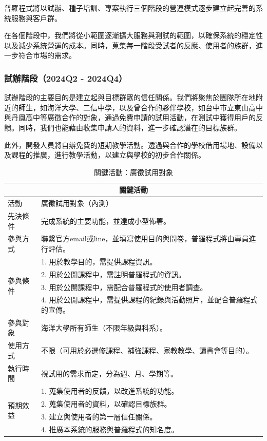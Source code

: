 普羅程式將以試辦、種子培訓、專案執行三個階段的營運模式逐步建立起完善的系統服務與客戶群。

在各個階段中，我們將從小範圍逐漸擴大服務與測試的範圍，以確保系統的穩定性以及減少系統營運的成本。同時，蒐集每一階段受試者的反應、使用者的族群，進一步符合市場的需求。
\subsubsection{試辦階段（2024Q2 - 2024Q4）}

試辦階段的主要目的是建立起與目標群眾的信任關係。我們將聚焦於團隊所在地附近的師生，如海洋大學、二信中學，以及曾合作的夥伴學校，如台中市立東山高中與丹鳳高中等廣徵合作的對象，通過免費申請的試用活動，在測試中獲得用戶的反饋。同時，我們也能藉由收集申請人的資料，進一步確認潛在的目標族群。

此外，開發人員將自辦免費的短期教學活動。透過與合作的學校借用場地、設備以及課程的推廣，進行教學活動，以建立與學校的初步合作關係。

\begin{table}[H]
  \centering
  \caption{關鍵活動：廣徵試用對象}
  \begin{tabular}{|l|l|}
      \hline
      \multicolumn{2}{|c|}{\textbf{關鍵活動}} \\ \hline
      活動 & 廣徵試用對象（內測） \\ \hline
      先決條件 & 完成系統的主要功能，並達成小型佈署。 \\ \hline
      參與方式 & 聯繫官方email或line，並填寫使用目的與問卷，普羅程式將由專員進行評估。 \\ \hline
      \multirow{4}{*}{參與條件} & 1. 用於教學目的，需提供課程資訊。 \\
      & 2. 用於公開課程中，需註明普羅程式的資訊。 \\ 
      & 3. 用於公開課程中，需配合普羅程式的使用者調查。 \\ 
      & 4. 用於公開課程中，需提供課程的紀錄與活動照片，並配合普羅程式的宣傳。 \\ \hline
      參與對象 & 海洋大學所有師生（不限年級與科系）。 \\ \hline
      使用方式 & 不限（可用於必選修課程、補強課程、家教教學、讀書會等目的）。 \\ \hline
      執行時間 & 視試用的需求而定，分為週、月、學期等。 \\ \hline
      \multirow{4}{*}{預期效益} & 1. 蒐集使用者的反饋，以改進系統的功能。 \\ 
      & 2. 蒐集使用者的資料，以確認目標族群。 \\ 
      & 3. 建立與使用者的第一層信任關係。 \\
      & 4. 推廣本系統的服務與普羅程式的知名度。 \\ \hline
  \end{tabular}
\end{table}

